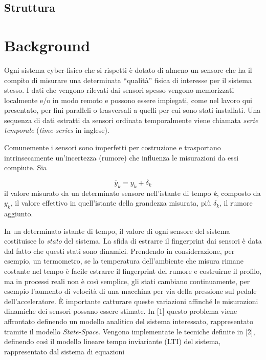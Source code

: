 \documentclass[Lau,binding=0.6cm]{sapthesis}
\begin{document}
\section{Struttura}



\chapter{Background}


Ogni sistema cyber-fisico che si rispetti è dotato di almeno un sensore che ha il compito di misurare una determinata ``qualità'' fisica di interesse per il sistema stesso. 
I dati che vengono rilevati dai sensori spesso vengono memorizzati localmente e/o in modo remoto e possono essere impiegati,
come nel lavoro qui presentato, per fini paralleli o trasversali a quelli per cui sono stati installati.
Una sequenza di dati estratti da sensori ordinata temporalmente viene chiamata \textit{serie temporale} (\textit{time-series} in inglese).

Comunemente i sensori sono imperfetti per costruzione e trasportano intrinsecamente un'incertezza (rumore) che influenza le misurazioni da essi compiute.
Sia 

\begin{equation}
\bar{y}_{k} = y_{k} + \delta_{k}\label{eq:1}
\end{equation}
il valore misurato da un determinato sensore nell'istante di tempo \textit{k}, composto da $y_k$, il valore effettivo in quell'istante della grandezza misurata, più $\delta_k$, il rumore aggiunto.

In un determinato istante di tempo, il valore di ogni sensore del sistema costituisce lo \textit{stato} del sistema.
La sfida di estrarre il fingerprint dai sensori è data dal fatto che questi stati sono dinamici. 
Prendendo in considerazione, per esempio, un termometro, se la temperatura dell'ambiente che misura rimane costante nel tempo è facile estrarre il fingerprint del rumore e costruirne il profilo, 
ma in processi reali non è così semplice, gli stati cambiano continuamente, per esempio l'aumento di velocità di una macchina per via della pressione sul pedale dell'acceleratore.
\`E importante catturare queste variazioni affinch\'e le misurazioni dinamiche dei sensori possano essere stimate.
In [1] questo problema viene affrontato definendo un modello analitico del sistema interessato, rappresentato tramite il modello \textit{State-Space}. 
Vengono implementate le tecniche definite in [2], definendo cos\`i il modello lineare tempo inviariante (LTI) del sistema, rappresentato dal sistema di equazioni
\end{document}

